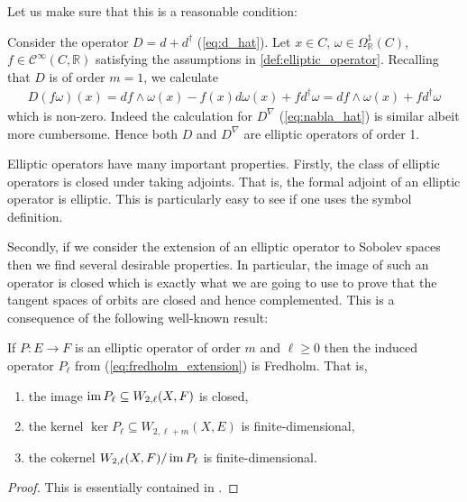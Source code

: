 \documentclass[12pt]{ociamthesis}  %
\begin{document}
Let us make sure that this is a reasonable condition:

\begin{example}
  Consider the operator $D = d + d^\dagger$ (\ref{eq:d_hat}). Let
  $x\in C$, $\omega\in\Omega^1_{\mathbb R}(C)$,
  $f\in \mathscr C^\infty(C,\mathbb R)$
  satisfying the assumptions in \ref{def:elliptic_operator}.
  Recalling that $D$ is of order $m=1$, we calculate
  \begin{align*}
    D(f\omega)(x)= df\wedge \omega(x) - f(x)d\omega(x) + fd^\dagger\omega= df\wedge\omega(x) + fd^\dagger\omega
  \end{align*}
  which is non-zero. Indeed the calculation for
  $D^\nabla$ (\ref{eq:nabla_hat}) is similar albeit more cumbersome.
  Hence both $D$ and $D^\nabla$ are elliptic operators of order 1.
\end{example}

Elliptic operators have many important properties. Firstly, the class
of elliptic operators is closed under taking adjoints. That is,
the formal adjoint of an elliptic operator is elliptic. This is particularly
easy to see if one uses the symbol definition.

Secondly, if we consider the extension of an elliptic operator
to Sobolev spaces then we find several desirable properties.
In particular, the image of such an operator is closed which is
exactly what we are going to use to prove that the tangent spaces
of orbits are closed and hence complemented. This is a consequence
of the following well-known result:

\begin{theorem}\label{thm:fredholm_extension}
  If $P : E\to F$ is an elliptic operator of order $m$ and $\ell\geq 0$
  then the induced operator $P_\ell$ from (\ref{eq:fredholm_extension})
  is Fredholm. That is,
  \begin{enumerate}
    \item the image $\operatorname{im} P_\ell \subseteq W_{2,\ell}(X,F)$ is closed,
    \item the kernel $\ker P_\ell \subseteq W_{2,\ell+m}(X,E)$ is finite-dimensional,
    \item the cokernel $W_{2,\ell}(X,F)/\operatorname{im} P_\ell$ is finite-dimensional.
  \end{enumerate}
  \begin{proof}
    This is essentially contained in \cite[Proposition 2.3(3)]{reutter2015}.
  \end{proof}
\end{theorem}
\end{document}

